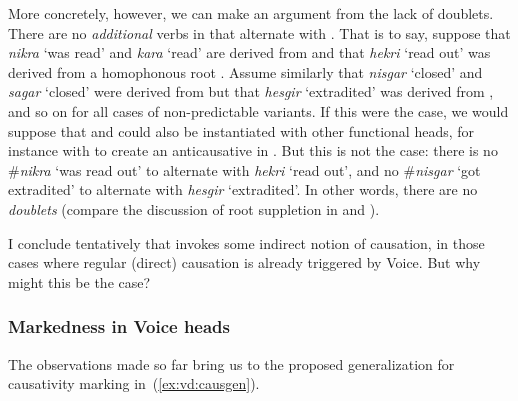 \begin{exe}
\begin{xlist}
\begin{xlist}
\begin{exe}
\begin{exe}
\begin{xlist}
\begin{exe}
\begin{xlist}
\begin{exe}
\begin{xlist}
\begin{xlist}
\begin{exe}
\begin{xlist}
\begin{exe}
\begin{xlist}
\begin{exe}
\begin{xlist}
\begin{exe}
\begin{exe}
\begin{exe}
\begin{xlist}
\begin{exe}
\begin{exe}
\begin{xlist}
\begin{xlist}
\begin{exe}
\begin{xlist}
\begin{exe}
\begin{exe}
\begin{xlist}
\begin{exe}
\begin{exe}
\begin{xlist}
\begin{exe}
\begin{xlist}
\begin{exe}
\begin{xlist}
\begin{exe}
\begin{xlist}
\begin{exe}
\begin{exe}
\begin{xlist}
\begin{exe}
\begin{exe}
\begin{xlist}
\begin{xlist}
\begin{exe}
\begin{xlist}
\begin{xlist}
\begin{exe}
\begin{xlist}
\begin{exe}
\begin{xlist}
More concretely, however, we can make an argument from the lack of doublets. There are no \emph{additional} verbs in {\tnif} that alternate with {\thif}. That is to say, suppose that \emph{nikra} `was read' and \emph{kara} `read' are derived from  and that \emph{hekri} `read out' was derived from a homophonous root . Assume similarly that \emph{nisgar} `closed' and \emph{sagar} `closed' were derived from  but that \emph{hesgir} `extradited' was derived from , and so on for all cases of non-predictable  variants. If this were the case, we would suppose that  and  could also be instantiated with other functional heads, for instance with {\vz} to create an anticausative in {\tnif}. But this is not the case: there is no \#\emph{nikra} `was read out' to alternate with \emph{hekri} `read out', and no \#\emph{nisgar} `got extradited' to alternate with \emph{hesgir} `extradited'. In other words, there are no \emph{doublets} (compare the discussion of root suppletion in \citealt{harley14thlia,harley14thlib,harley15roots} and \citealt{borer14thli}).

I conclude tentatively that {\vd} invokes some indirect notion of causation, in those cases where regular (direct) causation is already triggered by Voice. But why might this be the case?

			\subsubsection{Markedness in Voice heads} \label{vd:caus:markvoice}
The observations made so far bring us to the proposed generalization for causativity marking in~(\ref{ex:vd:causgen}).


\end{xlist}
\end{exe}
\end{xlist}
\end{exe}
\end{xlist}
\end{xlist}
\end{exe}
\end{xlist}
\end{xlist}
\end{exe}
\end{exe}
\end{xlist}
\end{exe}
\end{exe}
\end{xlist}
\end{exe}
\end{xlist}
\end{exe}
\end{xlist}
\end{exe}
\end{xlist}
\end{exe}
\end{exe}
\end{xlist}
\end{exe}
\end{exe}
\end{xlist}
\end{exe}
\end{xlist}
\end{xlist}
\end{exe}
\end{exe}
\end{xlist}
\end{exe}
\end{exe}
\end{exe}
\end{xlist}
\end{exe}
\end{xlist}
\end{exe}
\end{xlist}
\end{exe}
\end{xlist}
\end{xlist}
\end{exe}
\end{xlist}
\end{exe}
\end{xlist}
\end{exe}
\end{exe}
\end{xlist}
\end{xlist}
\end{exe}
